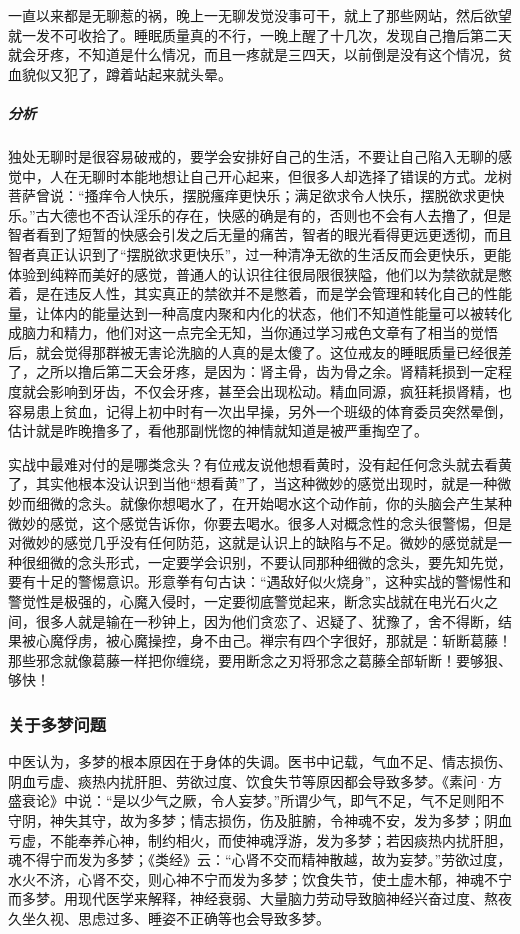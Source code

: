 \begin{case}
    一直以来都是无聊惹的祸，晚上一无聊发觉没事可干，就上了那些网站，然后欲望就一发不可收拾了。睡眠质量真的不行，一晚上醒了十几次，发现自己撸后第二天就会牙疼，不知道是什么情况，而且一疼就是三四天，以前倒是没有这个情况，贫血貌似又犯了，蹲着站起来就头晕。
    \subparagraph{分析} 独处无聊时是很容易破戒的，要学会安排好自己的生活，不要让自己陷入无聊的感觉中，人在无聊时本能地想让自己开心起来，但很多人却选择了错误的方式。龙树菩萨曾说：“搔痒令人快乐，摆脱瘙痒更快乐；满足欲求令人快乐，摆脱欲求更快乐。”古大德也不否认淫乐的存在，快感的确是有的，否则也不会有人去撸了，但是智者看到了短暂的快感会引发之后无量的痛苦，智者的眼光看得更远更透彻，而且智者真正认识到了“摆脱欲求更快乐”，过一种清净无欲的生活反而会更快乐，更能体验到纯粹而美好的感觉，普通人的认识往往很局限很狭隘，他们以为禁欲就是憋着，是在违反人性，其实真正的禁欲并不是憋着，而是学会管理和转化自己的性能量，让体内的能量达到一种高度内聚和内化的状态，他们不知道性能量可以被转化成脑力和精力，他们对这一点完全无知，当你通过学习戒色文章有了相当的觉悟后，就会觉得那群被无害论洗脑的人真的是太傻了。这位戒友的睡眠质量已经很差了，之所以撸后第二天会牙疼，是因为：肾主骨，齿为骨之余。肾精耗损到一定程度就会影响到牙齿，不仅会牙疼，甚至会出现松动。精血同源，疯狂耗损肾精，也容易患上贫血，记得上初中时有一次出早操，另外一个班级的体育委员突然晕倒，估计就是昨晚撸多了，看他那副恍惚的神情就知道是被严重掏空了。
\end{case}

实战中最难对付的是哪类念头？有位戒友说他想看黄时，没有起任何念头就去看黄了，其实他根本没认识到当他“想看黄”了，当这种微妙的感觉出现时，就是一种微妙而细微的念头。就像你想喝水了，在开始喝水这个动作前，你的头脑会产生某种微妙的感觉，这个感觉告诉你，你要去喝水。很多人对概念性的念头很警惕，但是对微妙的感觉几乎没有任何防范，这就是认识上的缺陷与不足。微妙的感觉就是一种很细微的念头形式，一定要学会识别，不要认同那种细微的念头，要先知先觉，要有十足的警惕意识。形意拳有句古诀：“遇敌好似火烧身”，这种实战的警惕性和警觉性是极强的，心魔入侵时，一定要彻底警觉起来，断念实战就在电光石火之间，很多人就是输在一秒钟上，因为他们贪恋了、迟疑了、犹豫了，舍不得断，结果被心魔俘虏，被心魔操控，身不由己。禅宗有四个字很好，那就是：斩断葛藤！那些邪念就像葛藤一样把你缠绕，要用断念之刃将邪念之葛藤全部斩断！要够狠、够快！

\subsubsection{关于多梦问题}

中医认为，多梦的根本原因在于身体的失调。医书中记载，气血不足、情志损伤、阴血亏虚、痰热内扰肝胆、劳欲过度、饮食失节等原因都会导致多梦。《素问·方盛衰论》中说：“是以少气之厥，令人妄梦。”所谓少气，即气不足，气不足则阳不守阴，神失其守，故为多梦；情志损伤，伤及脏腑，令神魂不安，发为多梦；阴血亏虚，不能奉养心神，制约相火，而使神魂浮游，发为多梦；若因痰热内扰肝胆，魂不得宁而发为多梦；《类经》云：“心肾不交而精神散越，故为妄梦。”劳欲过度，水火不济，心肾不交，则心神不宁而发为多梦；饮食失节，使土虚木郁，神魂不宁而多梦。用现代医学来解释，神经衰弱、大量脑力劳动导致脑神经兴奋过度、熬夜久坐久视、思虑过多、睡姿不正确等也会导致多梦。

